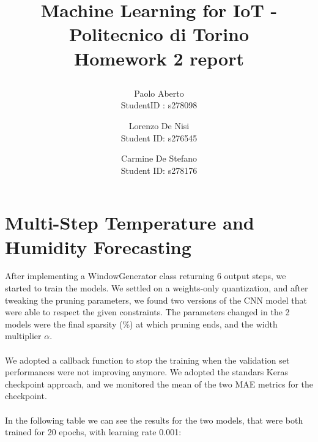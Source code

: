 \documentclass{article}
\date{}
\begin{document}
\author{Paolo Aberto\\
StudentID : s278098\\

\and
Lorenzo De Nisi\\
Student ID: s276545\\

\and
Carmine De Stefano\\
Student ID: s278176\\
}

\justifying

\title{
    \vspace{.5cm}
    
    Machine Learning for IoT - 
    Politecnico di Torino\\
    \vspace{1cm}
    \Large \textbf{Homework 2 report}
    \vspace{.5cm}
}

\maketitle
\thispagestyle{empty} 
\vspace{-0.5cm}


\section{Multi-Step Temperature and Humidity Forecasting}
After implementing a WindowGenerator class returning 6 output steps, we started to train the models. We settled on a weights-only quantization, and after tweaking the pruning parameters, we found two versions of the CNN model that were able to respect the given constraints.
The parameters changed in the 2 models were the final sparsity (\%) at which pruning ends, and the width multiplier $\alpha$.
\\\\
We adopted a callback function to stop the training when the validation set performances were not improving anymore. We adopted the standars Keras checkpoint approach, and we monitored the mean of the two MAE metrics for the checkpoint. 
\\\\
In the following table we can see the results for the two models, that were both trained for 20 epochs, with learning rate 0.001:

\vspace{0.2cm}
\end{document}
